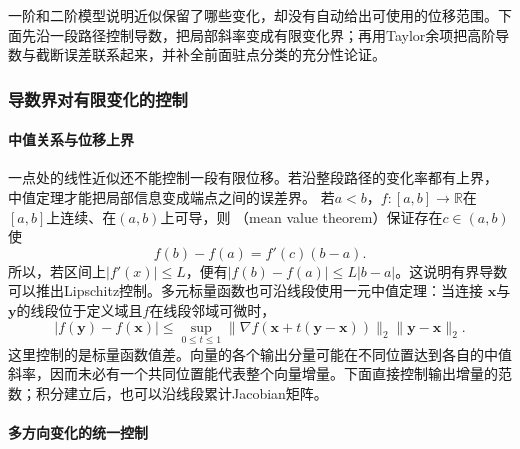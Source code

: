 一阶和二阶模型说明近似保留了哪些变化，却没有自动给出可使用的位移范围。下面先沿一段路径控制导数，把局部斜率变成有限变化界；再用Taylor余项把高阶导数与截断误差联系起来，并补全前面驻点分类的充分性论证。

\subsubsection{导数界对有限变化的控制}

\paragraph{中值关系与位移上界}

一点处的线性近似还不能控制一段有限位移。若沿整段路径的变化率都有上界，
中值定理才能把局部信息变成端点之间的误差界。
若$a<b$，$f:[a,b]\to\mathbb{R}$在$[a,b]$上连续、在$(a,b)$上可导，则
（mean value theorem）保证存在$c\in(a,b)$使
\begin{equation}
  f(b)-f(a)=f'(c)(b-a).
\label{eq:analysis-mean-value-theorem}
\end{equation}
所以，若区间上$|f'(x)|\leq L$，便有$|f(b)-f(a)|\leq L|b-a|$。这说明有界导数可以推出Lipschitz控制。多元标量函数也可沿线段使用一元中值定理：当连接 $\bm{x}$与$\bm{y}$的线段位于定义域且$f$在线段邻域可微时，
\[   |f(\bm{y})-f(\bm{x})|   \leq   \sup_{0\leq t\leq1}   \lVert\nabla f(\bm{x}+t(\bm{y}-\bm{x}))\rVert_2   \lVert\bm{y}-\bm{x}\rVert_2. \]
这里控制的是标量函数值差。向量的各个输出分量可能在不同位置达到各自的中值斜率，因而未必有一个共同位置能代表整个向量增量。下面直接控制输出增量的范数；积分建立后，也可以沿线段累计Jacobian矩阵。

\paragraph{多方向变化的统一控制}

